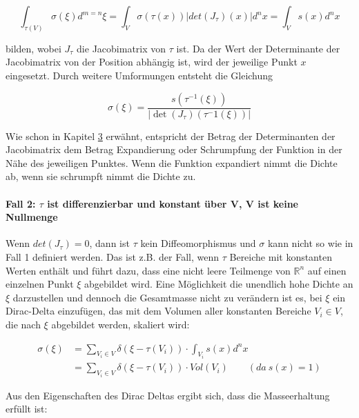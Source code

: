 \documentclass[a4paper,fontsize=12pt,toc=bib,halfparskip]{scrartcl}
\begin{document}
\begin{equation}
\int_{\tau(V)}\sigma(\xi)d^{m=n}\xi = \int_{V}\sigma(\tau(x))|det(J_\tau)(x)|d^nx = \int_{V}s(x)d^nx
\end{equation}

bilden, wobei $J_\tau$ die Jacobimatrix von $\tau$ ist. Da der Wert der Determinante der Jacobimatrix von der Position abh\"angig ist, wird der jeweilige Punkt $x$ eingesetzt. Durch weitere Umformungen entsteht die Gleichung

\begin{equation}
\sigma(\xi) = \frac{s(\tau^{-1}(\xi))}{|\det(J_\tau)(\tau^-1(\xi))|}
\label{Case1Formula}
\end{equation}

Wie schon in Kapitel \hyperref[sec:Grundlagen]{3} erw\"ahnt, entspricht der Betrag der Determinanten der Jacobimatrix dem Betrag Expandierung oder Schrumpfung der Funktion in der N\"ahe des jeweiligen Punktes. Wenn die Funktion expandiert nimmt die Dichte ab, wenn sie schrumpft nimmt die Dichte zu.

\paragraph{Fall 2: $\tau$ ist differenzierbar und konstant \"uber V, V ist keine Nullmenge}
Wenn $det(J_\tau) = 0$, dann ist $\tau$ kein Diffeomorphismus und $\sigma$ kann nicht so wie in Fall 1 definiert werden. Das ist z.B. der Fall, wenn $\tau$ Bereiche mit konstanten Werten enth\"alt und f\"uhrt dazu, dass eine nicht leere Teilmenge von $\mathbb{R}^n$ auf einen einzelnen Punkt $\xi$ abgebildet wird. Eine M\"oglichkeit die unendlich hohe Dichte an $\xi$ darzustellen und dennoch die Gesamtmasse nicht zu ver\"andern ist es, bei $\xi$ ein Dirac-Delta einzuf\"ugen, das mit dem Volumen aller konstanten Bereiche $V_i \in V$, die nach $\xi$ abgebildet werden, skaliert wird:

\begin{equation}
\begin{split}
\sigma(\xi) &= \sum_{V_i \in V}\delta(\xi - \tau(V_i)) \cdot \int_{V_i}s(x)d^nx\\
&= \sum_{V_i \in V}\delta(\xi - \tau(V_i)) \cdot Vol(V_i)~~~~~~~~~(da~s(x) = 1)
\end{split}
\label{DiracTimesVolume}
\end{equation}

Aus den Eigenschaften des Dirac Deltas ergibt sich, dass die Masseerhaltung erf\"ullt ist:
\end{document}
